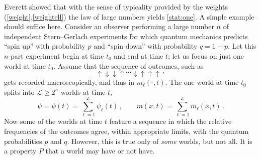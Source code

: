 \documentclass[12pt]{article}
\newcommand{\num}{n}
\newcommand{\Lnum}{\mathscr{L}}
\newcommand{\n}[1]{{#1}}
\begin{document}
Everett showed that with the sense of typicality provided by the weights (\ref{weight},\ref{weightell}) the law of large numbers yields \eqref{stat:one}. A simple example should suffice here. Consider an observer performing a large number $\num$ of independent Stern--Gerlach experiments for which quantum mechanics predicts ``spin up'' with probability $p$ and ``spin down'' with probability $q=1-p$. Let this $\num$-part experiment begin at time $t_0$ and end at time $t$; let us focus on just one world at time $t_0$. Assume that the sequence of outcomes, such as
\begin{equation}\label{sequence}
\uparrow \downarrow\downarrow\uparrow\ldots\downarrow \uparrow\uparrow\uparrow\,,
\end{equation}
gets recorded macroscopically, and thus in $m_\ell(\cdot,t)$. The one world at \n{time} $t_0$  splits into $\Lnum\geq 2^\num$ worlds at \n{time} $t$,
\begin{equation}\label{branching}
\psi=\psi(t) = \sum_{\ell=1}^\Lnum \psi_\ell(t)\,,\qquad
m(x,t) = \sum_{\ell=1}^\Lnum m_\ell(x,t)\,.
\end{equation}
Now some of the worlds at time $t$ feature a sequence in which the relative frequencies of the outcomes agree, within appropriate limits, with the quantum probabilities $p$ and $q$.  However, this is true only of \emph{some} worlds, but not all. It is a property $P$ that a world may have or not have. 
\end{document}
